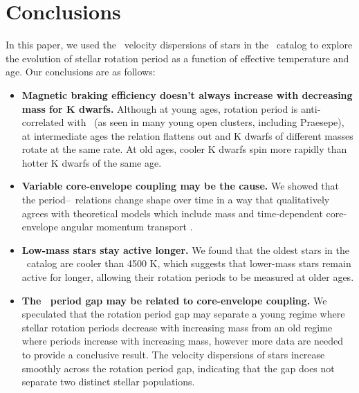 \section{Conclusions}

In this paper, we used the \vb\ velocity dispersions of stars in the \mct\
catalog to explore the evolution of stellar rotation period as a function of
effective temperature and age.
Our conclusions are as follows:
\begin{itemize}
\item{{\bf Magnetic braking efficiency doesn't always increase with decreasing
mass for K dwarfs.}
Although at young ages, rotation period is anti-correlated with \teff\ (as
seen in many young open clusters, including Praesepe), at intermediate ages the
relation flattens out and K dwarfs of different masses rotate at the same
rate.
At old ages, cooler K dwarfs spin more rapidly than hotter K dwarfs of the
same age.}

\item{{\bf Variable core-envelope coupling may be the cause.} We showed that
the period--\teff\ relations change shape over time in a way that
qualitatively agrees with theoretical models which include mass and
time-dependent core-envelope angular momentum transport \citep{spada2019}.}

\item{{\bf Low-mass stars stay active longer.}
We found that the oldest stars in the \mct\ catalog are cooler than 4500
K, which suggests that lower-mass stars remain active for longer, allowing
their rotation periods to be measured at older ages.}

\item{{\bf The \kepler\ period gap may be related to core-envelope coupling.}
We speculated that the rotation period gap \citep{mcquillan2014} may separate
a young regime where stellar rotation periods decrease with increasing mass
from an old regime where periods increase with increasing mass, however more
data are needed to provide a conclusive result.
The velocity dispersions of stars increase smoothly across the rotation period
gap, indicating that the gap does not separate two distinct stellar
populations.}


\end{itemize}
